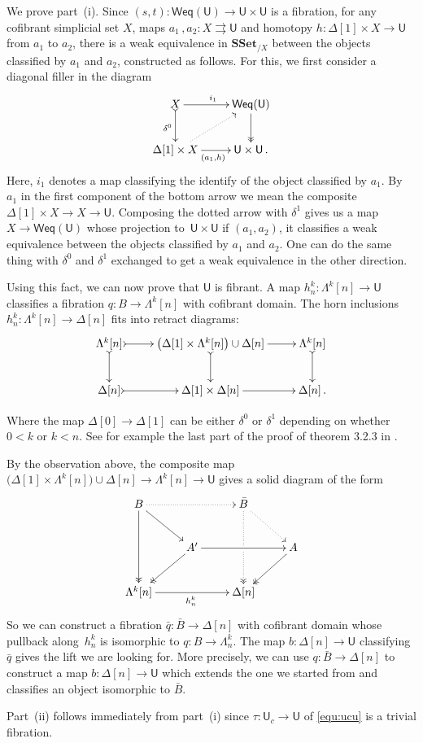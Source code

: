 \documentclass[reqno,10pt,a4paper,oneside,draft]{amsart}
\makeatletter
\renewenvironment{proof}[1][\proofname] {\par\pushQED{\qed}\normalfont\topsep6\p@\@plus6\p@\relax\trivlist\item[\hskip\labelsep\bf#1\@addpunct{.}]\ignorespaces}{\popQED\endtrivlist\@endpefalse}
\numberwithin{equation}{section}
\theoremstyle{mythm}
\theoremstyle{mydef}
\theoremstyle{myrmk}
\newcommand{\ie}{\text{i.e.\ }}
\newcommand{\co}{\colon}
\newcommand{\SSet}{\mathbf{SSet}}
\newcommand{\U}{\mathsf{U}}
\makeatother
\begin{document}
\begin{proof} We prove part~(i). Since
$(s, t) \co \mathsf{Weq}(\U) \rightarrow \U \times \U$ is a fibration, for any cofibrant 
simplicial set $X$,  maps $a_1 \, , a_2 \co X \rightrightarrows \U$ and homotopy $h \co \Delta[1] \times X \rightarrow \U$ from $a_1$ to $a_2$, there is a weak equivalence in $\SSet_{/X}$ between the objects classified by $a_1$ and $a_2$, constructed as follows. For this, we first consider a diagonal filler in the
diagram
\[
\xymatrix{ X \ar[r]^{i_1} \ar@{>->}[d]_{\delta^0} & \mathsf{Weq}(\U) \ar@{->>}[d] \\
\Delta[1] \times X \ar[r]_{(a_1,h)} \ar@{.>}[ur] & \U \times \U \, .
}
\]
Here, $i_1$ denotes a map classifying the identify of the object classified by $a_1$. By $a_1$ in the first component of the bottom arrow we mean the composite $\Delta[1] \times X \rightarrow X \rightarrow \U$. Composing the dotted arrow with $\delta^1$ gives us a map $X \rightarrow  \mathsf{Weq}(\U)$ whose projection to~$\U \times \U$ if $(a_1,a_2)$, \ie it classifies a weak equivalence between the objects classified by $a_1$ and $a_2$. One can do the same thing with $\delta^0$ and $\delta^1$ exchanged to get a weak equivalence in the other direction.

Using this fact, we can now prove that $\U$ is fibrant. A map $h^k_n \co \Lambda^k[n] \rightarrow \U $ classifies a fibration $q \co B \rightarrow \Lambda^k[n]$ with cofibrant domain. The horn inclusions $h^k_n \co \Lambda^k [n] \rightarrow \Delta[n]$ fits into retract diagrams:
\[
\xymatrix{\Lambda^k[n] \ar@{>->}[d] \ar@{>->}[r] & \big( \Delta[1] \times \Lambda^k[n] \big) \cup \Delta[n] \ar@{>->}[d] \ar[r] & \Lambda^k[n] \ar@{>->}[d]  \\
\Delta[n] \ar@{>->}[r] & \Delta[1] \times \Delta[n] \ar[r] & \Delta[n] \, .
}\]

Where the map $\Delta[0] \rightarrow \Delta[1]$ can be either $\delta^0$ or $\delta^1$ depending on whether $0<k$ or $k<n$. See for example the last part of the proof of theorem 3.2.3 in \cite{joyal-tierney:simplicial-homotopy-theory}.

By the observation above, the composite map $\big( \Delta[1] \times \Lambda^k[n]  \big) \cup \Delta[n] \rightarrow \Lambda^k[n] \to \U$  gives a solid diagram of the form
\[ 
\xymatrix{
  B
  \ar@{.>}[rr]
  \ar[dr]
  \ar@{->>}[dd]
&&
  \bar{B}
  \ar@{.>}[dr]
  \ar@{.>>}[dd]|{\hole}
&\\&
  A'
  \ar[rr]
  \ar@{->>}[dl]
&&
  A
  \ar@{->>}[dl]
\\
  \Lambda^k[n]
  \ar[rr]_{h^k_n}
&&
  \Delta[n]
&
}
\] 
So we can construct a fibration  $\bar{q} \co \bar{B} \to \Delta[n]$ with cofibrant domain whose pullback 
along~$h^k_n$ is isomorphic to $q \co B \to \Lambda^k_n$. The map $b \co \Delta[n] \rightarrow \U$ classifying $\bar{q}$ gives the lift we are looking for. More precisely, we can use $q  \co \bar{B} \to
\Delta[n]$ to construct  a map $b \co \Delta[n] \rightarrow \U$ which extends the one we started from and classifies 
an object isomorphic to $\bar{B}$.

Part~(ii) follows immediately from part~(i) since $\tau \co \U_c \to \U$ of \eqref{equ:ucu} is a trivial fibration.
\end{proof}
\end{document}

